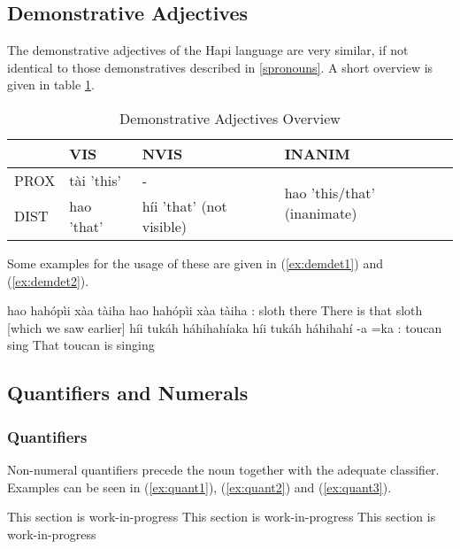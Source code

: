\documentclass[a4paper, 12pt, oneside]{memoir}
\begin{document}
\subsection{Demonstrative Adjectives}\label{sdemonstrative}
The demonstrative adjectives of the Hapi language are very similar, if not identical to those demonstratives described in \ref{spronouns}. A short overview is given in table \ref{t:demdet}.
\begin{table}[H]
\centering
\begin{tabular}{@{}llll@{}}
\toprule
     & VIS        & NVIS                     & INANIM                                       \\ \midrule
PROX & tài 'this' & -                        & \multirow{2}{*}{hao 'this/that' (inanimate)} \\
DIST & hao 'that' & híi 'that' (not visible) &                                              \\ \bottomrule
\end{tabular}
\caption{Demonstrative Adjectives Overview}
\label{t:demdet}
\end{table}
Some examples for the usage of these are given in (\ref{ex:demdet1}) and (\ref{ex:demdet2}).
\begin{examples}
\ex \label{ex:demdet1}
\words hao hahópìi xàa tàiha
\bits hao hahópìi xàa tàiha
\gloss {\Dem}:{\Dist} sloth {\Cop} there
\tr There is that sloth [which we saw earlier]
\ex \label{ex:demdet2}
\words híi tukáh háhihahíaka
\bits híi tukáh háhihahí -a =ka 
\gloss {\Det}:{\Nvis} toucan sing {\St} {\Decl}
\tr That toucan is singing
\end{examples}
\subsection{Quantifiers and Numerals}\label{squantifier}
\subsubsection{Quantifiers}
Non-numeral quantifiers precede the noun together with the adequate classifier. Examples can be seen in (\ref{ex:quant1}), (\ref{ex:quant2}) and (\ref{ex:quant3}).
\begin{examples}
\ex \label{ex:quant1}
This section is work-in-progress
\ex \label{ex:quant2}
This section is work-in-progress
\ex \label{ex:quant3}
This section is work-in-progress
\end{examples}
\end{document}
